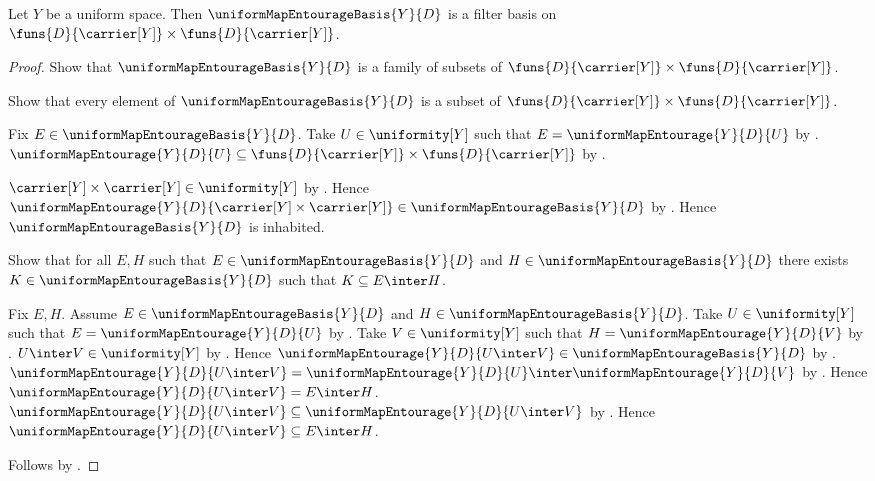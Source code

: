 \begin{theorem}\label{uniform_map_entourage_basis_is_filter_basis}
    Let $Y$ be a uniform space.
    Then $\uniformMapEntourageBasis{Y}{D}$ is a filter basis on
        $\funs{D}{\carrier[Y]}\times\funs{D}{\carrier[Y]}$.
\end{theorem}
\begin{proof}
    Show that $\uniformMapEntourageBasis{Y}{D}$ is a family of subsets of
        $\funs{D}{\carrier[Y]}\times\funs{D}{\carrier[Y]}$.
    \begin{subproof}
        Show that every element of $\uniformMapEntourageBasis{Y}{D}$ is a
            subset of
            $\funs{D}{\carrier[Y]}\times\funs{D}{\carrier[Y]}$.
        \begin{subproof}
            Fix $E\in\uniformMapEntourageBasis{Y}{D}$.
            Take $U\in\uniformity[Y]$ such that
                $E=\uniformMapEntourage{Y}{D}{U}$ by
                .
            $\uniformMapEntourage{Y}{D}{U}\subseteq
                \funs{D}{\carrier[Y]}\times\funs{D}{\carrier[Y]}$ by
                .
        \end{subproof}
    \end{subproof}

    $\carrier[Y]\times\carrier[Y]\in\uniformity[Y]$ by
        .
    Hence $\uniformMapEntourage{Y}{D}
        {\carrier[Y]\times\carrier[Y]}
        \in\uniformMapEntourageBasis{Y}{D}$ by
        .
    Hence $\uniformMapEntourageBasis{Y}{D}$ is inhabited.

    Show that for all $E,H$ such that
        $E\in\uniformMapEntourageBasis{Y}{D}$ and
        $H\in\uniformMapEntourageBasis{Y}{D}$ there exists
        $K\in\uniformMapEntourageBasis{Y}{D}$ such that
        $K\subseteq E\inter H$.
    \begin{subproof}
        Fix $E,H$.
        Assume $E\in\uniformMapEntourageBasis{Y}{D}$ and
            $H\in\uniformMapEntourageBasis{Y}{D}$.
        Take $U\in\uniformity[Y]$ such that
            $E=\uniformMapEntourage{Y}{D}{U}$ by
            .
        Take $V\in\uniformity[Y]$ such that
            $H=\uniformMapEntourage{Y}{D}{V}$ by
            .
        $U\inter V\in\uniformity[Y]$ by
            .
        Hence $\uniformMapEntourage{Y}{D}{U\inter V}
            \in\uniformMapEntourageBasis{Y}{D}$ by
            .
        $\uniformMapEntourage{Y}{D}{U\inter V}=
            \uniformMapEntourage{Y}{D}{U}\inter
                \uniformMapEntourage{Y}{D}{V}$ by
            .
        Hence $\uniformMapEntourage{Y}{D}{U\inter V}=E\inter H$.
        $\uniformMapEntourage{Y}{D}{U\inter V}
            \subseteq\uniformMapEntourage{Y}{D}{U\inter V}$ by
            .
        Hence $\uniformMapEntourage{Y}{D}{U\inter V}\subseteq E\inter H$.
    \end{subproof}
    Follows by .
\end{proof}

